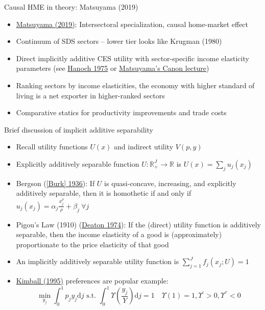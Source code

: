 \documentclass[11pt,notes=hide,aspectratio=169]{beamer}
\begin{document}
\begin{frame}{Causal HME in theory: Matsuyama (2019)}
\begin{itemize}
	\item \href{https://onlinelibrary-wiley-com.proxy.uchicago.edu/doi/10.3982/ECTA13765}{Matsuyama (2019)}: Intersectoral specialization, causal home-market effect
	\item Continuum of SDS sectors -- lower tier looks like Krugman (1980)
	\item Direct implicitly additive CES utility with sector-specific income elasticity parameters (see \href{https://ideas.repec.org/a/ecm/emetrp/v43y1975i3p395-419.html}{Hanoch 1975} or \href{http://faculty.wcas.northwestern.edu/~kmatsu/}{Matsuyama's Canon lecture})
	\item Ranking sectors by income elasticities, the economy with higher standard of living is a net exporter in higher-ranked sectors
	\item Comparative statics for productivity improvements and trade costs
\end{itemize}
\end{frame}
\begin{frame}{Brief discussion of implicit additive separability}
\begin{itemize}
	\item Recall utility functions $U(x)$ and indirect utility $V(p,y)$
	\item Explicitly additively separable function $U: \mathbb{R}_{+}^{J} \to \mathbb{R}$ is $U(x) = \sum_j u_j(x_j)$
	\item Bergson (\href{https://www.jstor.org/stable/2967658}{[Burk] 1936}): If $U$ is quasi-concave, increasing, and explicitly additively separable,
	then it is homothetic if and only if
	$u_j(x_j) = \alpha_j \frac{x_j^{\rho}}{\rho} + \beta_j \ \forall j$
	\item Pigou's Law (1910) (\href{https://www.jstor.org/stable/2231258}{Deaton 1974}): If the (direct) utility function is additively separable, then the income elasticity of a good is (approximately) proportionate to the price elasticity of that good
	\item An implicitly additively separable utility function is
	$\sum_{j=1}^{J} f_j\left(x_j; U\right)=1$
	\item \href{https://ideas.repec.org/a/mcb/jmoncb/v27y1995i4p1241-77.html}{Kimball (1995)} preferences are popular example:
	$$
	\min_{y_j} \int_{0}^{1} p_j y_j \textrm{d}j \text{ s.t. } \int_{0}^{1} \Upsilon \left(\frac{y_j}{Y}\right) \textrm{d}j = 1 
	\quad \Upsilon(1) = 1, \Upsilon^{'}>0, \Upsilon^{''}<0
	$$
\end{itemize}
\end{frame}
\end{document}
